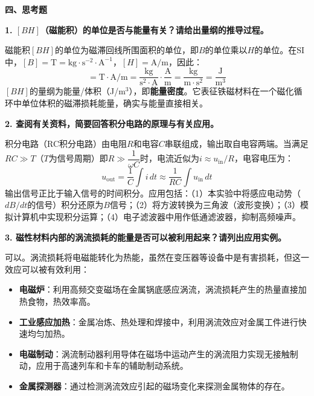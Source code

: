 \documentclass[a4paper,12pt]{article}
\begin{document}
\newpage

{\fontsize{16pt}{24pt}\selectfont \textbf{四、思考题}}

\vspace{0.5cm}

{\fontsize{12pt}{18pt}\selectfont

\textbf{1. $[BH]$（磁能积）的单位是否与能量有关？请给出量纲的推导过程。}

磁能积$[BH]$的单位为磁滞回线所围面积的单位，即$B$的单位乘以$H$的单位。在SI中，$[B] = \text{T} = \text{kg}\cdot\text{s}^{-2}\cdot\text{A}^{-1}$，$[H] = \text{A/m}$，因此：
\begin{equation}
[BH] = \text{T} \cdot \text{A/m} = \frac{\text{kg}}{\text{s}^2 \cdot \text{A}} \cdot \frac{\text{A}}{\text{m}} = \frac{\text{kg}}{\text{m} \cdot \text{s}^2} = \frac{\text{J}}{\text{m}^3}
\end{equation}
$[BH]$的量纲为能量/体积（J/m$^3$），即\textbf{能量密度}。它表征铁磁材料在一个磁化循环中单位体积的磁滞损耗能量，确实与能量直接相关。

\vspace{0.5cm}

\textbf{2. 查阅有关资料，简要回答积分电路的原理与有关应用。}

积分电路（RC积分电路）由电阻$R$和电容$C$串联组成，输出取自电容两端。当满足$RC \gg T$（$T$为信号周期）即$R \gg \dfrac{1}{\omega C}$时，电流近似为$i \approx u_{\text{in}}/R$，电容电压为：
\begin{equation}
u_{\text{out}} = \frac{1}{C}\int i\,dt \approx \frac{1}{RC}\int u_{\text{in}}\,dt
\end{equation}
输出信号正比于输入信号的时间积分。应用包括：（1）本实验中将感应电动势（$dB/dt$的信号）积分还原为$B$信号；（2）将方波转换为三角波（波形变换）；（3）模拟计算机中实现积分运算；（4）电子滤波器中用作低通滤波器，抑制高频噪声。

\vspace{0.5cm}

\textbf{3. 磁性材料内部的涡流损耗的能量是否可以被利用起来？请列出应用实例。}

可以。涡流损耗将电磁能转化为热能，虽然在变压器等设备中是有害损耗，但这一效应可以被有效利用：
\begin{itemize}[nosep]
    \item \textbf{电磁炉}：利用高频交变磁场在金属锅底感应涡流，涡流损耗产生的热量直接加热食物，热效率高。
    \item \textbf{工业感应加热}：金属冶炼、热处理和焊接中，利用涡流效应对金属工件进行快速均匀加热。
    \item \textbf{电磁制动}：涡流制动器利用导体在磁场中运动产生的涡流阻力实现无接触制动，应用于高速列车和卡车的辅助制动系统。
    \item \textbf{金属探测器}：通过检测涡流效应引起的磁场变化来探测金属物体的存在。
\end{itemize}

}
\end{document}
